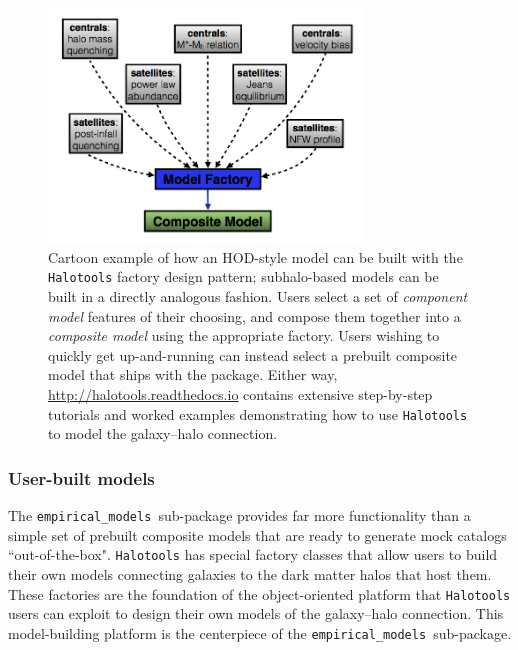 \documentclass[twocolumn, tighten]{aastex6}
\newcommand{\emodels}{{\tt empirical\_models }}
\begin{document}
\begin{figure}
\begin{center}
\includegraphics[width=8.3cm]{./FIGS/halotools_design.png}
\caption{
Cartoon example of how an HOD-style model can be built with the {\tt Halotools} factory design pattern; subhalo-based models can be built in a directly analogous fashion. Users select a set of {\em component model} features of their choosing, and compose them together into a {\em composite model} using the appropriate factory. Users wishing to quickly get up-and-running can instead select a prebuilt composite model that ships with the package. Either way, \url{http://halotools.readthedocs.io} contains extensive step-by-step tutorials and worked examples demonstrating how to use {\tt Halotools} to model the galaxy--halo connection.
}
\label{fig:modeling}
\end{center}
\end{figure}


\subsubsection{User-built models}
\label{subsubsection:userbuiltmodels}

The \emodels sub-package provides far more functionality than a simple set of prebuilt composite models that are ready to generate mock catalogs ``out-of-the-box". {\tt Halotools} has special factory classes that allow users to build their own models connecting galaxies to the dark matter halos that host them. These factories are the foundation of the object-oriented platform that {\tt Halotools} users can exploit to design their own models of the galaxy--halo connection. This model-building platform is the centerpiece of the \emodels sub-package.
\end{document}
